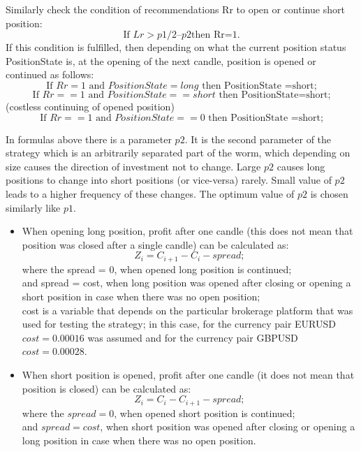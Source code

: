 \documentclass[runningheads,a4paper]{llncs}
\begin{document}
Similarly check the condition of recommendations Rr to open or continue short position:
\begin{equation}
\text{If } Lr>p1/2 – p2 \text {then Rr=1.}
\end{equation}
If this condition is fulfilled, then depending on what the current position status PositionState is, at the opening of the next candle, position is opened or continued as follows: \\
\begin{equation}
\text{If } Rr=1 \text{ and } PositionState =long \text{ then PositionState =short;}
\end{equation}
\begin{equation}
\text{If } Rr==1 \text{ and } PositionState ==short \text{ then PositionState=short;}
\end{equation}
(costless continuing of opened position)
\begin{equation}
\text{If } Rr==1 \text{ and }  PositionState ==0 \text{ then  PositionState =short;}
\end{equation}

In formulas above there is a parameter $p2$. It is the second parameter of the strategy which is an arbitrarily separated part of the worm, which depending on size causes the direction of investment not to change. Large $p2$ causes long positions to change into short positions (or vice-versa) rarely. Small value of $p2$ leads to a higher frequency of these changes. The optimum value of $p2$ is chosen similarly like $p1$.
\begin{itemize}
\item 	When opening long position, profit after one candle (this does not mean that position was closed after a single candle) can be calculated as:
\begin{equation}
Z_i = C_{i+1} - C_i - spread;
\end{equation}
where the spread = 0, when opened long position is continued; \\
and spread = cost, when long position was opened after closing or opening a short position in case when there was no open position;\\
cost is a variable that depends on the particular brokerage platform that was used for testing the strategy; in this case, for the currency pair EURUSD $cost = 0.00016$ was assumed and for the currency pair GBPUSD $cost = 0.00028$.
\item When short position is opened, profit after one candle (it does not mean that position is closed) can be calculated as: 
\begin{equation}
Z_i = C_i-C_{i+1}- spread;
\end{equation}
where the $spread = 0$, when opened short position is continued;\\ 
and $spread = cost$, when short position was opened after closing or opening a long position in case when there was no open position.
\end{itemize}
\end{document}
